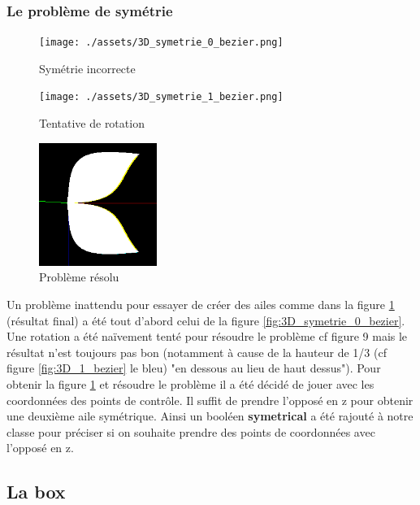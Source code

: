 \documentclass{article}
\begin{document}
\subsubsection{Le problème de symétrie}

\begin{figure}[!htb]
	\centering
	\begin{minipage}{0.3\textwidth}
    	\centering
    	\texttt{[image: ./assets/3D\_symetrie\_0\_bezier.png]}
    	\caption{Symétrie incorrecte}
    	\label{fig:3D_symetrie_0_bezier}
	\end{minipage}
	\begin{minipage}{0.3\textwidth}
    	\centering
    	\texttt{[image: ./assets/3D\_symetrie\_1\_bezier.png]}
    	\caption{Tentative de rotation}
    	\label{fig:3D_symetrie_1_bezier}
	\end{minipage}
	\begin{minipage}{0.3\textwidth}
    	\centering
    	\includegraphics[height=4cm]{./assets/3D_symetrie_2_bezier.png}
    	\caption{Problème résolu}
    	\label{fig:3D_symetrie_2_bezier}
	\end{minipage}
\end{figure}

Un problème inattendu pour essayer de créer des ailes comme dans la figure \ref{fig:3D_symetrie_2_bezier} (résultat final) a été tout d'abord celui de la figure \ref{fig:3D_symetrie_0_bezier}. Une rotation a été naïvement tenté pour résoudre le problème cf figure 9 mais le résultat n'est toujours pas bon (notamment à cause de la hauteur de 1/3 (cf figure \ref{fig:3D_1_bezier} le bleu) "en dessous au lieu de haut dessus"). Pour obtenir la figure \ref{fig:3D_symetrie_2_bezier} et résoudre le problème il a été décidé de jouer avec les coordonnées des points de contrôle. Il suffit de prendre l'opposé en z pour obtenir une deuxième aile symétrique. Ainsi un booléen \textbf{symetrical} a été rajouté à notre classe pour préciser si on souhaite prendre des points de coordonnées avec l'opposé en z. 

\subsection{La box}
	
\end{document}
